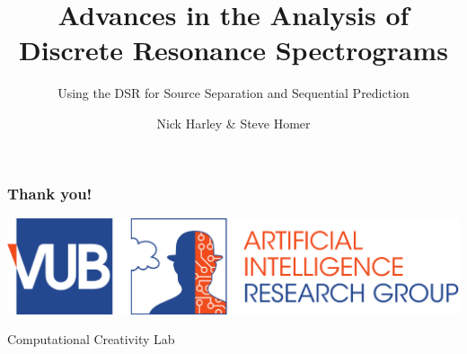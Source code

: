 \documentclass{beamer}
\begin{document}
\title{Advances in the Analysis of \\ Discrete Resonance Spectrograms}
\subtitle{Using the DSR for Source Separation and Sequential Prediction}
\author{Nick Harley \& Steve Homer}
\date{}
\frame{\titlepage}

%



\begin{frame}
  \frametitle{Thank you!}
  \includegraphics[width=\textwidth]{dept/vub-ai.pdf}
  \begin{center}
    \huge{Computational Creativity Lab}
  \end{center}
\end{frame}
\end{document}
